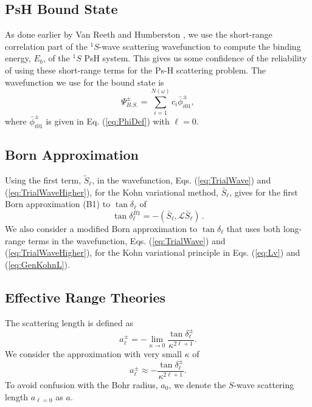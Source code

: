 \documentclass[preprint,showpacs,showkeys,preprintnumbers,amsmath,amssymb,longbibliography,pra,aps]{revtex4-1}
\begin{document}
{\subsection{PsH Bound State}
As done earlier by Van Reeth and Humberston \cite{VanReeth2003,VanReeth2004},
we use the short-range correlation part of the $^1S$-wave scattering wavefunction
to compute the binding energy, $E_b$, of the $^1S$ PsH system. This gives us
some confidence of the reliability of using these short-range terms for the Ps-H 
scattering problem. The wavefunction we use for the bound state is
\begin{equation}
\label{eq:BoundWavefn}
\Psi_{B.S.}^\pm = \sum_{i=1}^{N(\omega)} c_i \bar{\phi}_{i01}^\pm,
\end{equation}
where $\bar{\phi}_{i01}^\pm$ is given in Eq. (\ref{eq:PhiDef}) with
$\ell = 0$.

\subsection{Born Approximation}
Using the first term, $\widetilde{S}_\ell$, in the wavefunction,
Eqs. (\ref{eq:TrialWave}) and (\ref{eq:TrialWaveHigher}), for
the Kohn variational method, $\bar S_\ell$, gives for the first
Born approximation (B1) to $\tan\delta_\ell$ of \cite{Bransden2003}
\begin{equation}
\label{eq:Born}
\tan\delta_\ell^{B1} = -(\bar{S}_\ell,\mathcal{L}\bar{S}_\ell )\,.
\end{equation}
We also consider a modified Born approximation to $\tan\delta_\ell$ that uses
both long-range terms in the wavefunction,
Eqs. (\ref{eq:TrialWave}) and (\ref{eq:TrialWaveHigher}), for the Kohn
variational principle in Eqs. (\ref{eq:Lv}) and (\ref{eq:GenKohnL}).


\subsection{Effective Range Theories}

The scattering length is defined as \cite{Bransden2003}
\begin{equation}
\label{eq:ScatLen}
a_\ell^\pm = -\lim_{\kappa \to 0}
  \frac{\tan{\delta_\ell^\pm}}{\kappa^{2\ell+1}}.
\end{equation}
We consider the approximation with very small $\kappa$ of
\begin{equation}
\label{eq:ScatLenApprox}
a_\ell^\pm \approx
  - \frac{\tan{\delta_\ell^\pm}}{\kappa^{2\ell+1}}.
\end{equation}
To avoid confusion with the Bohr radius, $a_0$, we denote
the $S$-wave scattering length $a_{\ell=0}$ as $a$.

}
\end{document}
